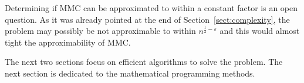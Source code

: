 Determining if MMC can be approximated to within a constant factor is an open question. As it was already pointed at the end of Section~\ref{sect:complexity}, the problem may possibly be not approximable to within $n^{\frac{1}{2}-\varepsilon}$ and this would almost tight the approximability of MMC.

The next two sections focus on efficient algorithms to solve the problem. The next section is dedicated to the mathematical programming methods.